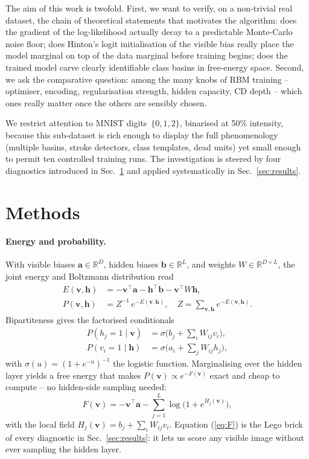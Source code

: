 \documentclass[10pt,twocolumn,a4paper]{article}
\begin{document}
The aim of this work is twofold. First, we want to verify, on a
non-trivial real dataset, the chain of theoretical statements that
motivates the algorithm: does the gradient of the log-likelihood
actually decay to a predictable Monte-Carlo noise floor; does Hinton's
logit initialisation of the visible bias really place the model
marginal on top of the data marginal before training begins; does the
trained model carve clearly identifiable class basins in free-energy
space. Second, we ask the comparative question: among the many knobs
of RBM training -- optimiser, encoding, regularisation strength,
hidden capacity, CD depth -- which ones really matter once the others
are sensibly chosen.

We restrict attention to MNIST digits~$\{0,1,2\}$, binarised at 50\%
intensity, because this sub-dataset is rich enough to display the full
phenomenology (multiple basins, stroke detectors, class templates,
dead units) yet small enough to permit ten controlled training runs.
The investigation is steered by four diagnostics introduced in
Sec.~\ref{sec:methods} and applied systematically in
Sec.~\ref{sec:results}.

\section{Methods}\label{sec:methods}

\paragraph{Energy and probability.}
With visible biases $\bm{a}\!\in\!\mathbb{R}^D$, hidden biases
$\bm{b}\!\in\!\mathbb{R}^L$, and weights $W\!\in\!\mathbb{R}^{D\times L}$,
the joint energy and Boltzmann distribution read
\begin{align}
E(\bm{v},\bm{h}) &= -\bm{v}^{\!\top}\bm{a}-\bm{h}^{\!\top}\bm{b}-\bm{v}^{\!\top} W \bm{h}, \\
P(\bm{v},\bm{h}) &= Z^{-1}\,e^{-E(\bm{v},\bm{h})},\quad
 Z=\!\!\sum_{\bm{v},\bm{h}}\!\! e^{-E(\bm{v},\bm{h})}.
 \label{eq:joint}
\end{align}
Bipartiteness gives the factorised conditionals
\begin{align}
P(h_j\!=\!1\!\mid\!\bm{v})\!&=\!\sigma\!\Big(b_j\!+\!\sum_i\!W_{ij}v_i\Big), \nonumber\\
P(v_i\!=\!1\!\mid\!\bm{h})\!&=\!\sigma\!\Big(a_i\!+\!\sum_j\!W_{ij}h_j\Big),
 \label{eq:cond}
\end{align}
with $\sigma(u)=(1+e^{-u})^{-1}$ the logistic function. Marginalising
over the hidden layer yields a free energy that makes
$P(\bm{v})\!\propto\!e^{-F(\bm{v})}$ exact and cheap to compute -- no
hidden-side sampling needed:
\begin{equation}
F(\bm{v})=-\bm{v}^{\!\top}\bm{a}-\sum_{j=1}^{L}\log\!\big(1+e^{H_j(\bm{v})}\big),
 \label{eq:F}
\end{equation}
with the local field $H_j(\bm{v})=b_j+\sum_i W_{ij}v_i$. Equation
(\ref{eq:F}) is the Lego brick of every diagnostic in
Sec.~\ref{sec:results}: it lets us score any visible image without
ever sampling the hidden layer.
\end{document}
